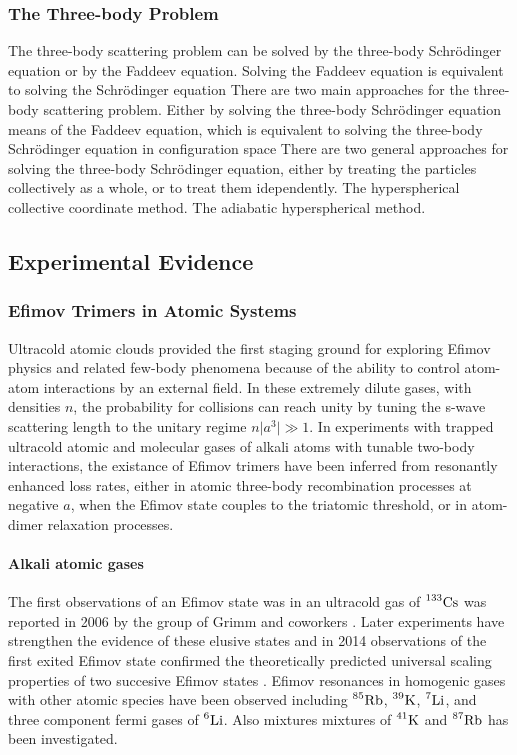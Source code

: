 \documentclass{article}
\providecommand{\abs}[1]{\lvert#1\rvert} \providecommand{\norm}[1]{\lVert#1\rVert}
\numberwithin{equation}{section}
\begin{document}
\subsubsection{The Three-body Problem}
The three-body scattering problem can be solved by the three-body Schr{\"o}dinger equation or by the Faddeev equation. Solving the Faddeev equation is equivalent to solving the Schr{\"o}dinger equation 
There are two main approaches for the three-body scattering problem. Either by solving the three-body Schr{\"o}dinger equation means of the Faddeev equation, which is equivalent to solving the three-body Schr{\"o}dinger equation in configuration space   
There are two general approaches for solving the three-body Schr{\"o}dinger equation, either by treating the particles collectively as a whole, or to treat them idependently. The hyperspherical collective coordinate method. The adiabatic hyperspherical method.

\subsection{Experimental Evidence}
\subsubsection{Efimov Trimers in Atomic Systems}
Ultracold atomic clouds provided the first staging ground for exploring Efimov physics and related few-body phenomena because of the ability to control atom-atom interactions by an external field. In these extremely dilute gases, with densities $n$, the probability for collisions can reach unity by tuning the s-wave scattering length to the unitary regime $n\abs{a^3}\gg1$. In experiments with trapped ultracold atomic and molecular gases of alkali atoms with tunable two-body interactions, the existance of Efimov trimers have been inferred from resonantly enhanced loss rates, either in atomic three-body recombination processes at negative $a$, when the Efimov state couples to the triatomic threshold, or in atom-dimer relaxation processes. 
\paragraph{Alkali atomic gases} 
The first observations of an Efimov state was in an ultracold gas of $\prescript{133}{}{\mathrm{Cs}}$ was reported in 2006 by the group of Grimm and coworkers \cite{Grimm:2006}. Later experiments have strengthen the evidence of these elusive states and in 2014 observations of the first exited Efimov state confirmed the theoretically predicted universal scaling properties of two succesive Efimov states \cite{Huang2014}. Efimov resonances in homogenic gases with other atomic species have been observed including $\prescript{85}{}{\mathrm{Rb}}$, $\prescript{39}{}{\mathrm{K}}$, $\prescript{7}{}{\mathrm{Li}}$, and three component fermi gases of $\prescript{6}{}{\mathrm{Li}}$. Also mixtures mixtures of $\prescript{41}{}{\mathrm{K}}$ and $\prescript{87}{}{\mathrm{Rb}}$ has been investigated.
\end{document}
